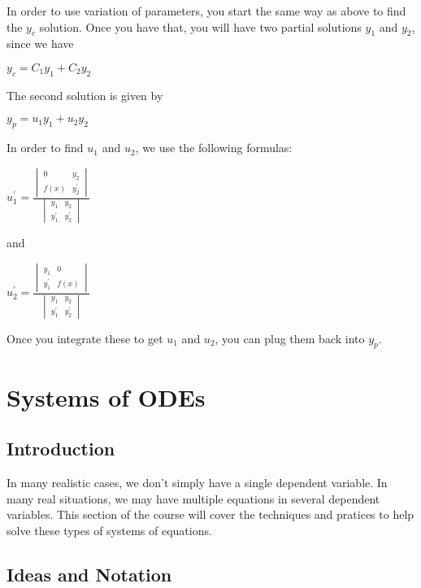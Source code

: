 \documentclass[
  letterpaper,
]{report}
\begin{document}
In order to use variation of parameters, you start the same way as above
to find the \(y_c\) solution. Once you have that, you will have two
partial solutions \(y_1\) and \(y_2\), since we have

\(y_c = C_1 y_1 + C_2 y_2\)

The second solution is given by

\(y_p = u_1 y_1 + u_2 y_2\)

In order to find \(u_1\) and \(u_2\), we use the following formulas:

\(u_1^{'} = \frac{
\begin{vmatrix}
0 & y_2 \\
f(x) & y_2^{'}
\end{vmatrix}}{\begin{vmatrix}
y_1 & y_2 \\
y_1^{'} & y_2^{'}
\end{vmatrix}}\)

and

\(u_2^{'} = \frac{
\begin{vmatrix}
y_1 & 0 \\
y_1^{'} & f(x)
\end{vmatrix}}{\begin{vmatrix}
y_1 & y_2 \\
y_1^{'} & y_2^{'}
\end{vmatrix}}\)

Once you integrate these to get \(u_1\) and \(u_2\), you can plug them
back into \(y_p\).


\chapter{Systems of ODEs}\label{systems-of-odes}

\section{Introduction}\label{introduction-2}

In many realistic cases, we don't simply have a single dependent
variable. In many real situations, we may have multiple equations in
several dependent variables. This section of the course will cover the
techniques and pratices to help solve these types of systems of
equations.

\section{Ideas and Notation}\label{ideas-and-notation}
\end{document}
